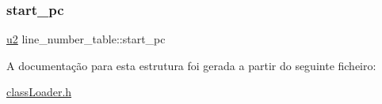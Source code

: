 \mbox{\label{structline__number__table_a6b2853f752039f060c94612f910f6fa0}} 
\subsubsection{\texorpdfstring{start\+\_\+pc}{start\_pc}}
{\footnotesize\ttfamily \hyperlink{util_8h_a55ef8d87fd202b8417704c089899c5b9}{u2} line\+\_\+number\+\_\+table\+::start\+\_\+pc}



A documentação para esta estrutura foi gerada a partir do seguinte ficheiro\+:\begin{DoxyCompactItemize}
\item 
\hyperlink{class_loader_8h}{class\+Loader.\+h}\end{DoxyCompactItemize}
